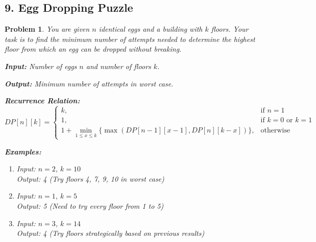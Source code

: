 \documentclass{article}
\newtheorem{problem}{Problem}
\begin{document}
\subsection*{9. Egg Dropping Puzzle}
\begin{problem}
You are given $n$ identical eggs and a building with $k$ floors. Your task is to find the minimum number of attempts needed to determine the highest floor from which an egg can be dropped without breaking.

\textbf{Input:} Number of eggs $n$ and number of floors $k$.

\textbf{Output:} Minimum number of attempts in worst case.

\textbf{Recurrence Relation:}
\[
DP[n][k] = 
\begin{cases}
k, & \text{if } n = 1 \\
1, & \text{if } k = 0 \text{ or } k = 1 \\
1 + \min_{1 \leq x \leq k} \{\max(DP[n-1][x-1], DP[n][k-x])\}, & \text{otherwise}
\end{cases}
\]

\textbf{Examples:}
\begin{enumerate}
\item Input: $n = 2$, $k = 10$ \\
      Output: 4 (Try floors 4, 7, 9, 10 in worst case)
\item Input: $n = 1$, $k = 5$ \\
      Output: 5 (Need to try every floor from 1 to 5)
\item Input: $n = 3$, $k = 14$ \\
      Output: 4 (Try floors strategically based on previous results)
\end{enumerate}
\end{problem}

\end{document}
